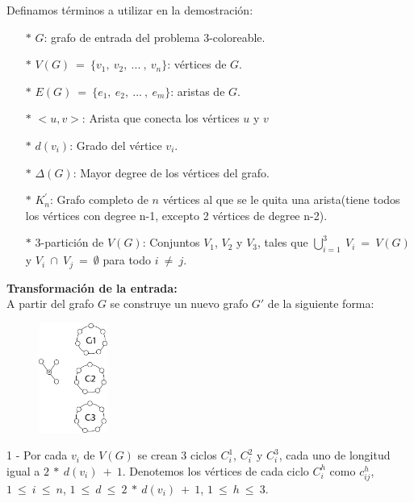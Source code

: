 \documentclass{article}
\begin{document}
Definamos t\'erminos a utilizar en la demostraci\'on: 
\begin{itemize}
    \item[$\ast $] $G$: grafo de entrada del problema 3-coloreable.
    \item[$\ast $] $V(G)~ = ~\{v_1,~ v_2,~ ... ~, ~v_n\}$: v\'ertices de $G$.
    \item[$\ast $] $E(G)~ = ~\{e_1, ~e_2,~ ...~ ,~ e_m\}$: aristas de $G$.
    \item[$\ast $] $<u,v>$: Arista que conecta los v\'ertices $u$ y $v$
    \item[$\ast $] $d(v_i)$: Grado del v\'ertice $v_i$.
    \item[$\ast $] $\Delta(G)$: Mayor degree de los v\'ertices del grafo.
    \item[$\ast $] $K^{'}_n$: Grafo completo de $n$ v\'ertices al que se le quita una arista(tiene todos los v\'ertices con degree n-1, excepto 2 v\'ertices de degree n-2).
    \item[$\ast $] $3$-partici\'on de $V(G)$: Conjuntos $V_1$, $V_2$ y $V_3$, tales que $\bigcup_{i=1}^{3} ~V_i~ = ~V(G)$  y $V_i ~\cap~ V_j~ =~ \emptyset$ para todo $i~ \neq~ j$.
\end{itemize}

\textbf{Transformaci\'on de la entrada:}\\

A partir del grafo $G$ se construye un nuevo grafo $G'$ de la siguiente forma:\\ 

\begin{figure}
    \centering
    \includegraphics[width= 0.2\textwidth]{img1.png}
\end{figure}

1 - Por cada $v_i$ de $V(G)$ se crean $3$ ciclos $C_i^1$, $C_i^2$ y $C_i^3$, cada uno de longitud igual a $2 ~*~ d(v_i)~ + ~1$. Denotemos 
los v\'ertices de cada ciclo $C_i^h$ como $c_{ij}^h$, $1~ \leq~i~\leq ~n$, $1~ \leq~d~\leq ~2 ~*~ d(v_i)~ + ~1$, $1~ \leq~h~\leq ~3$.\\ 
\end{document}
